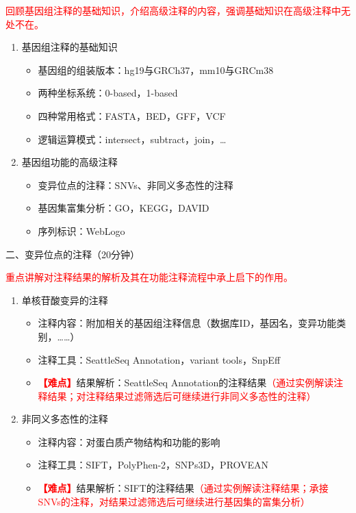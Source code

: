 \documentclass{TIJMUjiaoanLL}
\begin{document}
\textcolor{red}{回顾基因组注释的基础知识，介绍高级注释的内容，强调基础知识在高级注释中无处不在。}
\begin{enumerate}
  \item 基因组注释的基础知识
    \begin{itemize}
      \item 基因组的组装版本：hg19与GRCh37，mm10与GRCm38
      \item 两种坐标系统：0-based，1-based
      \item 四种常用格式：FASTA，BED，GFF，VCF
      \item 逻辑运算模式：intersect，subtract，join，\ldots
    \end{itemize}
  \item 基因组功能的高级注释
    \begin{itemize}
      \item 变异位点的注释：SNVs、非同义多态性的注释
      \item 基因集富集分析：GO，KEGG，DAVID
      \item 序列标识：WebLogo
    \end{itemize}
\end{enumerate}

\vspace*{0.2cm}
\noindent
二、变异位点的注释（20分钟）

\textcolor{red}{重点讲解对注释结果的解析及其在功能注释流程中承上启下的作用。}
\begin{enumerate}
  \item 单核苷酸变异的注释
    \begin{itemize}
      \item 注释内容：附加相关的基因组注释信息（数据库ID，基因名，变异功能类别，……）
      \item 注释工具：SeattleSeq Annotation，variant tools，SnpEff
      \item \textcolor{red}{\textbf{【难点】}}结果解析：SeattleSeq Annotation的注释结果\textcolor{red}{（通过实例解读注释结果；对注释结果过滤筛选后可继续进行非同义多态性的注释）}
    \end{itemize}
  \item 非同义多态性的注释
    \begin{itemize}
      \item 注释内容：对蛋白质产物结构和功能的影响
      \item 注释工具：SIFT，PolyPhen-2，SNPs3D，PROVEAN
      \item \textcolor{red}{\textbf{【难点】}}结果解析：SIFT的注释结果\textcolor{red}{（通过实例解读注释结果；承接SNVs的注释，对结果过滤筛选后可继续进行基因集的富集分析）}
    \end{itemize}
\end{enumerate}
\end{document}
